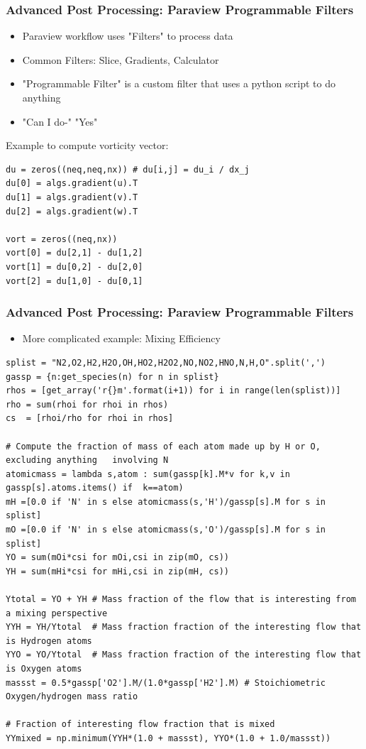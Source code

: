\documentclass[landscape,10pt]{beamer}
\begin{document}
\begin{frame}[fragile]
\frametitle{Advanced Post Processing: Paraview Programmable Filters}
\begin{itemize}
\item Paraview workflow uses "Filters" to process data
\item Common Filters: Slice, Gradients, Calculator
\item "Programmable Filter" is a custom filter that uses a python script to do anything
\item "Can I do-" "Yes"
\end{itemize}

\vspace{10mm}

Example to compute vorticity vector:
\begin{scriptsize}
\begin{lstlisting}
du = zeros((neq,neq,nx)) # du[i,j] = du_i / dx_j
du[0] = algs.gradient(u).T
du[1] = algs.gradient(v).T
du[2] = algs.gradient(w).T

vort = zeros((neq,nx))
vort[0] = du[2,1] - du[1,2]
vort[1] = du[0,2] - du[2,0]
vort[2] = du[1,0] - du[0,1]
\end{lstlisting}
\end{scriptsize}

\end{frame}

\begin{frame}[fragile]
\frametitle{Advanced Post Processing: Paraview Programmable Filters}
\begin{itemize}
\item More complicated example: Mixing Efficiency
\end{itemize}

\begin{scriptsize}
\begin{lstlisting}
splist = "N2,O2,H2,H2O,OH,HO2,H2O2,NO,NO2,HNO,N,H,O".split(',')
gassp = {n:get_species(n) for n in splist}
rhos = [get_array('r{}m'.format(i+1)) for i in range(len(splist))]
rho = sum(rhoi for rhoi in rhos)
cs  = [rhoi/rho for rhoi in rhos]

# Compute the fraction of mass of each atom made up by H or O, excluding anything   involving N
atomicmass = lambda s,atom : sum(gassp[k].M*v for k,v in gassp[s].atoms.items() if  k==atom)
mH =[0.0 if 'N' in s else atomicmass(s,'H')/gassp[s].M for s in splist]
mO =[0.0 if 'N' in s else atomicmass(s,'O')/gassp[s].M for s in splist]
YO = sum(mOi*csi for mOi,csi in zip(mO, cs))
YH = sum(mHi*csi for mHi,csi in zip(mH, cs))

Ytotal = YO + YH # Mass fraction of the flow that is interesting from a mixing perspective
YYH = YH/Ytotal  # Mass fraction fraction of the interesting flow that is Hydrogen atoms
YYO = YO/Ytotal  # Mass fraction fraction of the interesting flow that is Oxygen atoms
massst = 0.5*gassp['O2'].M/(1.0*gassp['H2'].M) # Stoichiometric Oxygen/hydrogen mass ratio

# Fraction of interesting flow fraction that is mixed
YYmixed = np.minimum(YYH*(1.0 + massst), YYO*(1.0 + 1.0/massst))
\end{lstlisting}
\end{scriptsize}
\end{frame}
\end{document}

